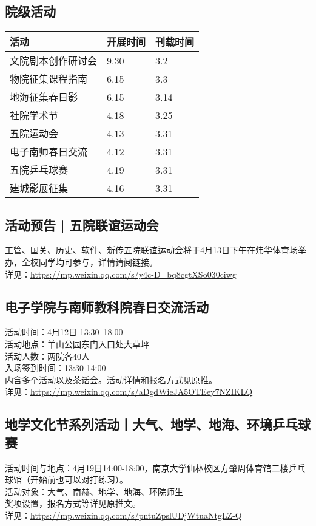 \documentclass[letterpaper, 12pt]{article}
\begin{document}
\begin{multicols}{2}
\section{院级活动}
\begin{tabular}{|>{\centering\arraybackslash}m{}|m{}|m{}|}
\hline
    活动 & 开展时间 & 刊载时间\\
    \hline\hline
    文院剧本创作研讨会 & 9.30 & 3.2\\
    物院征集课程指南 & 6.15 & 3.3\\
    地海征集春日影 & 6.15 & 3.14\\
    社院学术节 & 4.18 & 3.25\\
    五院运动会 & 4.13 & 3.31\\
    电子南师春日交流 & 4.12 & 3.31\\
    五院乒乓球赛 & 4.19 & 3.31\\
    建城影展征集 & 4.16 & 3.31\\
    
    \hline
\end{tabular}
\subsection{活动预告 | 五院联谊运动会}
工管、国关、历史、软件、新传五院联谊运动会将于4月13日下午在炜华体育场举办，全校同学均可参与，详情请阅链接。
\\详见：\url{https://mp.weixin.qq.com/s/y4c-D_bq8cgtXSo030ciwg}


\subsection{电子学院与南师教科院春日交流活动}
活动时间：4月12日 13:30--18:00
\\活动地点：羊山公园东门入口处大草坪
\\活动人数：两院各40人
\\入场签到时间：13:30-14:00
\\内含多个活动以及茶话会。活动详情和报名方式见原推。
\\详见：\url{https://mp.weixin.qq.com/s/aDgdWieJA5OTEey7NZIKLQ}


\subsection{地学文化节系列活动丨大气、地学、地海、环境乒乓球赛}
活动时间与地点：4月19日14:00-18:00，南京大学仙林校区方肇周体育馆二楼乒乓球馆（开始前也可以对打练习）。
\\活动对象：大气、南赫、地学、地海、环院师生
\\奖项设置，报名方式等详见原推文。
\\详见：\url{https://mp.weixin.qq.com/s/pntuZpslUDjWtuaNtgLZ-Q}


\end{multicols}
\end{document}
